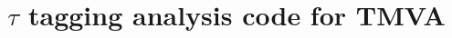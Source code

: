 \documentclass[a4paper]{jpconf}
\begin{document}

 


\section{$\tau$ tagging analysis code for TMVA }\label{sec:code}

\end{document}
